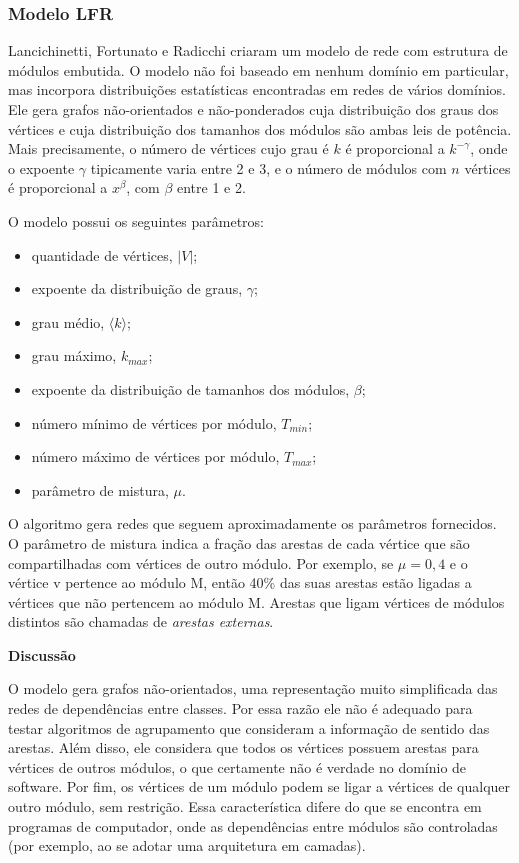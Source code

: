 \documentclass{acm_proc_article-sp}
\begin{document}
\subsubsection{Modelo LFR}

Lancichinetti, Fortunato e Radicchi \cite{Lancichinetti2008} criaram um modelo de rede com estrutura de módulos embutida. O modelo não foi baseado em nenhum domínio em particular, mas incorpora distribuições estatísticas encontradas em redes de vários domínios. Ele gera grafos não-orientados e não-ponderados cuja distribuição dos graus dos vértices e cuja distribuição dos tamanhos dos módulos são ambas leis de potência. Mais precisamente, o número de vértices cujo grau é $k$ é proporcional a $k^{-\gamma}$, onde o expoente $\gamma$ tipicamente varia entre 2 e 3, e o número de módulos com $n$ vértices é proporcional a $x^{\beta}$, com $\beta$ entre 1 e 2.

O modelo possui os seguintes parâmetros:
\begin{itemize}
  \item quantidade de vértices, $|V|$;
  \item expoente da distribuição de graus, $\gamma$;
  \item grau médio, $\langle k \rangle$;
  \item grau máximo, $k_{max}$;
  \item expoente da distribuição de tamanhos dos módulos, $\beta$;
  \item número mínimo de vértices por módulo, $T_{min}$;
  \item número máximo de vértices por módulo, $T_{max}$;
  \item parâmetro de mistura, $\mu$.
\end{itemize}

O algoritmo gera redes que seguem aproximadamente os parâmetros fornecidos. O parâmetro de mistura indica a fração das arestas de cada vértice que são compartilhadas com vértices de outro módulo. Por exemplo, se $\mu = 0,4$ e o vértice v pertence ao módulo M, então 40\% das suas arestas estão ligadas a vértices que não pertencem ao módulo M. Arestas que ligam vértices de módulos distintos são chamadas de \emph{arestas externas}.

  \textbf{Discussão}

  O modelo gera grafos não-orientados, uma representação muito simplificada das redes de dependências entre classes. Por essa razão ele não é adequado para testar algoritmos de agrupamento que consideram a informação de sentido das arestas. Além disso, ele considera que todos os vértices possuem arestas para vértices de outros módulos, o que certamente não é verdade no domínio de software. Por fim, os vértices de um módulo podem se ligar a vértices de qualquer outro módulo, sem restrição. Essa característica difere do que se encontra em programas de computador, onde as dependências entre módulos são controladas (por exemplo, ao se adotar uma arquitetura em camadas).
\end{document}
